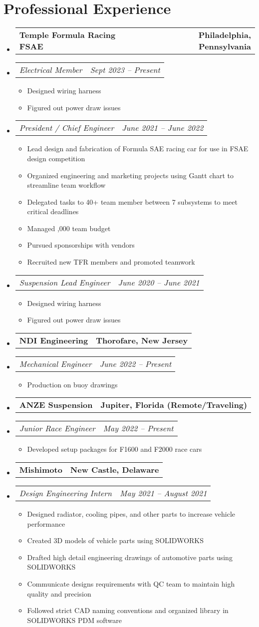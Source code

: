 \documentclass[letterpaper,11pt]{article}
\makeatletter
\newcommand{\company}[2]{
  \vspace{-2pt}\item
    \begin{tabular*}{1.0\textwidth}[t]{l@{\extracolsep{\fill}}r}
      \textbf{#1} & \textbf{\small #2} \\
    \end{tabular*}\vspace{-18pt}
}
\newcommand{\role}[2]{
  \vspace{-5pt}\item
    \begin{tabular*}{1.0\textwidth}[t]{l@{\extracolsep{\fill}}r}
      \textit{\small#1} & \textit{\small #2} \\
    \end{tabular*}\vspace{-7pt}
}
\newcommand{\resumeItem}[1]{
  \item\small{
    {#1 \vspace{-2pt}}
  }
}
\newcommand{\companyListStart}{\begin{itemize}[leftmargin=0.0in, label={}]}
\newcommand{\companyListEnd}{\end{itemize}}
\newcommand{\resumeItemListStart}{\begin{itemize}}
\newcommand{\resumeItemListEnd}{\end{itemize}\vspace{-5pt}}
\makeatother
\begin{document}
\section{Professional Experience}
  \companyListStart
    \company{Temple Formula Racing FSAE}{Philadelphia, Pennsylvania}
        \role{Electrical Member}{Sept 2023 -- Present}
            \resumeItemListStart
            \resumeItem{Designed wiring harness}
            \resumeItem{Figured out power draw issues}
            \resumeItemListEnd
        \role{President / Chief Engineer}{June 2021 -- June 2022}
            \resumeItemListStart
            \resumeItem{Lead design and fabrication of Formula SAE racing car for use in FSAE design competition}
            \resumeItem{Organized engineering and marketing projects using Gantt chart to streamline team workflow}
            \resumeItem{Delegated tasks to 40+ team member between 7 subsystems to meet critical deadlines}
            \resumeItem{Managed ,000 team budget}
            \resumeItem{Pursued sponsorships with vendors}
            \resumeItem{Recruited new TFR members and promoted teamwork}
            \resumeItemListEnd
        \role{Suspension Lead Engineer}{June 2020 -- June 2021}
            \resumeItemListStart
            \resumeItem{Designed wiring harness}
            \resumeItem{Figured out power draw issues}
            \resumeItemListEnd
    \company{NDI Engineering}{Thorofare, New Jersey}
        \role{Mechanical Engineer}{June 2022 -- Present}
            \resumeItemListStart
            \resumeItem{Production on buoy drawings}
            \resumeItemListEnd
    \company{ANZE Suspension}{Jupiter, Florida (Remote/Traveling)}
        \role{Junior Race Engineer}{May 2022 -- Present}
            \resumeItemListStart
            \resumeItem{Developed setup packages for F1600 and F2000 race cars}
            \resumeItemListEnd
    \company{Mishimoto}{New Castle, Delaware}
        \role{Design Engineering Intern}{May 2021 -- August 2021}
            \resumeItemListStart
            \resumeItem{Designed radiator, cooling pipes, and other parts to increase vehicle performance}
            \resumeItem{Created 3D models of vehicle parts using SOLIDWORKS}
            \resumeItem{Drafted high detail engineering drawings of automotive parts using SOLIDWORKS}
            \resumeItem{Communicate designs requirements with QC team to maintain high quality and precision}
            \resumeItem{Followed strict CAD naming conventions and organized library in SOLIDWORKS PDM software}
            \resumeItemListEnd
  \companyListEnd
\vspace{-16pt}
\end{document}
